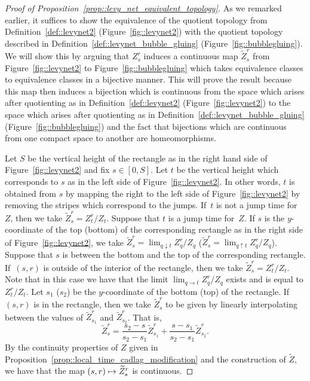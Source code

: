 \documentclass[JEP,XML,SOM,Unicode]{cedram}
\newcommand\mto{\mathchoice{\longmapsto}{\mapsto}{\mapsto}{\mapsto}}
\theoremstyle{plain}
\numberwithin{theorem}{section}
\theoremstyle{definition}
\let\wt\widetilde
\begin{document}
\begin{proof}[Proof of Proposition~\ref{prop::levy_net_equivalent_topology}]
As we remarked earlier, it suffices to show the equivalence of the quotient topology from Definition~\ref{def::levynet2} (Figure~\ref{fig::levynet2}) with the quotient topology described in Definition~\ref{def::levynet_bubble_gluing} (Figure~\ref{fig::bubblegluing}). We will show this by arguing that $Z_s^r$ induces a continuous map $\wt{Z}_s^r$ from Figure~\ref{fig::levynet2} to Figure~\ref{fig::bubblegluing} which takes equivalence classes to equivalence classes in a bijective manner. This will prove the result because this map then induces a bijection which is continuous from the space which arises after quotienting as in Definition~\ref{def::levynet2} (Figure~\ref{fig::levynet2}) to the space which arises after quotienting as in Definition~\ref{def::levynet_bubble_gluing} (Figure~\ref{fig::bubblegluing}) and the fact that bijections which are continuous from one compact space to another are homeomorphisms.

Let $S$ be the vertical height of the rectangle as in the right hand side of Figure~\ref{fig::levynet2} and fix $s \in [0,S]$. Let $t$ be the vertical height which corresponds to $s$ as in the left side of Figure~\ref{fig::levynet2}. In other words, $t$ is obtained from $s$ by mapping the right to the left side of Figure~\ref{fig::levynet2} by removing the stripes which correspond to the jumps. If~$t$ is not a jump time for~$Z$, then we take $\wt{Z}_s^r = Z_t^r / Z_t$. Suppose that $t$ is a jump time for~$Z$. If $s$ is the $y$-coordinate of the top (\resp bottom) of the corresponding rectangle as in the right side of Figure~\ref{fig::levynet2}, we take $\wt{Z}_s^r = \lim_{q \downarrow t} Z_q^r / Z_q$ (\resp $\wt{Z}_s^r = \lim_{q \uparrow t} Z_q^r / Z_q$). Suppose that $s$ is between the bottom and the top of the corresponding rectangle. If~$(s,r)$ is outside of the interior of the rectangle, then we take $\wt{Z}_s^r = Z_t^r / Z_t$. Note that in this case we have that the limit $\lim_{q \to t} Z_q^r / Z_q$ exists and is equal to $Z_t^r / Z_t$. Let $s_1$ (\resp $s_2$) be the $y$-coordinate of the bottom (\resp top) of the rectangle. If $(s,r)$ is in the rectangle, then we take $\wt{Z}_s^r$ to be given by linearly interpolating between the values of $\wt{Z}_{s_1}^r$ and $\wt{Z}_{s_2}^r$. That is,
\[
\wt{Z}_s^r = \frac{s_2-s}{s_2-s_1} \wt{Z}_{s_1}^r + \frac{s-s_1}{s_2-s_1} \wt{Z}_{s_2}^r.
\]
By the continuity properties of $Z$ given in Proposition~\ref{prop::local_time_cadlag_modification} and the construction of $\wt{Z}$, we have that the map $(s,r) \mto \wt{Z}_s^r$ is continuous.


\end{proof}
\end{document}

